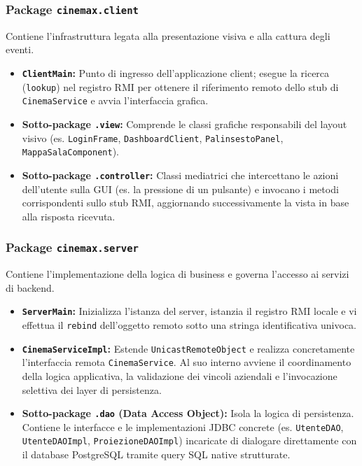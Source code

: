 \documentclass{article}
\begin{document}
\subsubsection{Package \texttt{cinemax.client}}
Contiene l'infrastruttura legata alla presentazione visiva e alla cattura degli eventi.
\begin{itemize}
    \item \textbf{\texttt{ClientMain}:} Punto di ingresso dell'applicazione client; esegue la ricerca (\texttt{lookup}) nel registro RMI per ottenere il riferimento remoto dello stub di \texttt{CinemaService} e avvia l'interfaccia grafica.
    \item \textbf{Sotto-package \texttt{.view}:} Comprende le classi grafiche responsabili del layout visivo (es. \texttt{LoginFrame}, \texttt{DashboardClient}, \texttt{PalinsestoPanel}, \texttt{MappaSalaComponent}). 
    \item \textbf{Sotto-package \texttt{.controller}:} Classi mediatrici che intercettano le azioni dell'utente sulla GUI (es. la pressione di un pulsante) e invocano i metodi corrispondenti sullo stub RMI, aggiornando successivamente la vista in base alla risposta ricevuta.
\end{itemize}

\subsubsection{Package \texttt{cinemax.server}}
Contiene l'implementazione della logica di business e governa l'accesso ai servizi di backend.
\begin{itemize}
    \item \textbf{\texttt{ServerMain}:} Inizializza l'istanza del server, istanzia il registro RMI locale e vi effettua il \texttt{rebind} dell'oggetto remoto sotto una stringa identificativa univoca.
    \item \textbf{\texttt{CinemaServiceImpl}:} Estende \texttt{UnicastRemoteObject} e realizza concretamente l'interfaccia remota \texttt{CinemaService}. Al suo interno avviene il coordinamento della logica applicativa, la validazione dei vincoli aziendali e l'invocazione selettiva dei layer di persistenza.
    \item \textbf{Sotto-package \texttt{.dao} (Data Access Object):} Isola la logica di persistenza. Contiene le interfacce e le implementazioni JDBC concrete (es. \texttt{UtenteDAO}, \texttt{UtenteDAOImpl}, \texttt{ProiezioneDAOImpl}) incaricate di dialogare direttamente con il database PostgreSQL tramite query SQL native strutturate.
\end{itemize}
\end{document}
